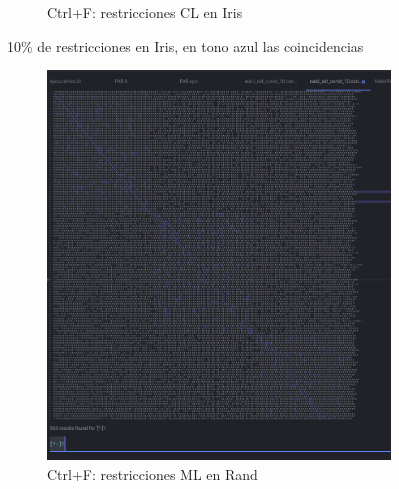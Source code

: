 \documentclass[12pt, spanish]{article}
\begin{document}
\begin{figure}[H]
\begin{subfigure}[b]{0.5\textwidth}
 		 \caption{Ctrl+F: restricciones CL en Iris}
  		\label{fig:rest_iris_10_-1}
  \end{subfigure}
    \caption{10\% de restricciones en Iris, en tono azul las coincidencias}\label{fig:rest_iris_10}

\end{figure}


\begin{figure}[H]
  \centering
  \begin{subfigure}[b]{0.45\textwidth}
      \includegraphics[scale = 0.28]{rest_rand_10.png}
 		 \caption{Ctrl+F: restricciones ML en Rand}
  		\label{fig:rest_rand_10_1}
  \end{subfigure}
  \hfill
  \begin{subfigure}[b]{0.5\textwidth}

\end{subfigure}
\end{figure}
\end{document}
